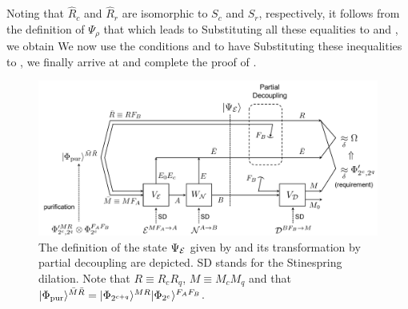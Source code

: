 \documentclass[journal]{IEEEtran}
\begin{document}
Noting that $\hat{R}_c$ and $\hat{R}_r$ are isomorphic to $S_c$ and $S_r$, respectively, it follows from the definition  of $\Psi_\rho$ that
which leads to
Substituting all these equalities to   and , 
we obtain
We now use the conditions  and  to have
Substituting these inequalities to , we finally arrive at 
and complete the proof of .
\QED




\begin{figure}[t]
\begin{center}
\includegraphics[bb={0 0 1266 579}, scale=0.3]{figure14.pdf}
\end{center}
\caption{
The definition of the state $\Psi_{{\mathcal E}}$ given by  and its transformation by partial decoupling are depicted.
SD stands for the Stinespring dilation. Note that $R\equiv R_cR_q$, $M\equiv M_cM_q$ and that $|\Phi_{\rm pur}\rangle^{\bar{M}\bar{R}}=|\Phi_{2^{c+q}}\rangle^{MR}|\Phi_{2^e}\rangle^{F_AF_B}$.
}
\label{fig:converse}
\end{figure}
\end{document}
